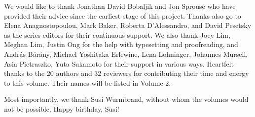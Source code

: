 \begin{refsection}

We would like to thank Jonathan David Bobaljik and Jon Sprouse who have provided their advice since the earliest stage of this project. 
Thanks also go to Elena Anagnostopoulou, Mark Baker, Roberta D'Alessandro, and David Pesetsky as the series editors for their continuous support. 
We also thank Joey Lim, Meghan Lim, Justin Ong for the help with typesetting and proofreading, and András Bárány, Michael Yoshitaka Erlewine, Lena Lohninger, Johannes Mursell, Asia Pietraszko, Yuta Sakamoto for their support in various ways.
Heartfelt thanks to the 20 authors and 32 reviewers for contributing their time and energy to this volume. Their names will be listed in Volume 2.



Most importantly, we thank Susi Wurmbrand, without whom the volumes would not be possible. Happy birthday, Susi!

\begin{comment}
Jonathan Bobaljik
Jon Sprouse
Zheng's students who did typesetting

Reviewers (by name?)

Lena Lohninger: for providing the email of Valentin Panzirsch
Elena Anagnostopoulou: for providing the email address of Athanasios
Yuta Sakamoto: for finding email addresses
\end{comment}

\printbibliography[heading=subbibliography]
\end{refsection}

